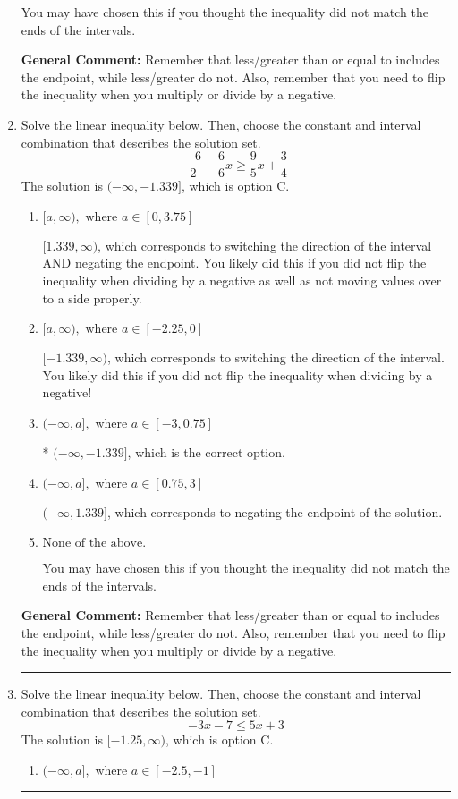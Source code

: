 \documentclass{extbook}[14pt]
\newcommand{\litem}[1]{\item #1

\rule{\textwidth}{0.4pt}}
\begin{document}
\begin{enumerate}
{\begin{enumerate}[label=\Alph*.]
You may have chosen this if you thought the inequality did not match the ends of the intervals.
\end{enumerate}

\textbf{General Comment:} Remember that less/greater than or equal to includes the endpoint, while less/greater do not. Also, remember that you need to flip the inequality when you multiply or divide by a negative.
}
\litem{
Solve the linear inequality below. Then, choose the constant and interval combination that describes the solution set.
\[ \frac{-6}{2} - \frac{6}{6} x \geq \frac{9}{5} x + \frac{3}{4} \]The solution is \( (-\infty, -1.339] \), which is option C.\begin{enumerate}[label=\Alph*.]
\item \( [a, \infty), \text{ where } a \in [0, 3.75] \)

 $[1.339, \infty)$, which corresponds to switching the direction of the interval AND negating the endpoint. You likely did this if you did not flip the inequality when dividing by a negative as well as not moving values over to a side properly.
\item \( [a, \infty), \text{ where } a \in [-2.25, 0] \)

 $[-1.339, \infty)$, which corresponds to switching the direction of the interval. You likely did this if you did not flip the inequality when dividing by a negative!
\item \( (-\infty, a], \text{ where } a \in [-3, 0.75] \)

* $(-\infty, -1.339]$, which is the correct option.
\item \( (-\infty, a], \text{ where } a \in [0.75, 3] \)

 $(-\infty, 1.339]$, which corresponds to negating the endpoint of the solution.
\item \( \text{None of the above}. \)

You may have chosen this if you thought the inequality did not match the ends of the intervals.
\end{enumerate}

\textbf{General Comment:} Remember that less/greater than or equal to includes the endpoint, while less/greater do not. Also, remember that you need to flip the inequality when you multiply or divide by a negative.
}
\litem{
Solve the linear inequality below. Then, choose the constant and interval combination that describes the solution set.
\[ -3x -7 \leq 5x + 3 \]The solution is \( [-1.25, \infty) \), which is option C.\begin{enumerate}[label=\Alph*.]
\item \( (-\infty, a], \text{ where } a \in [-2.5, -1] \)


\end{enumerate}}
\end{enumerate}
\end{document}
